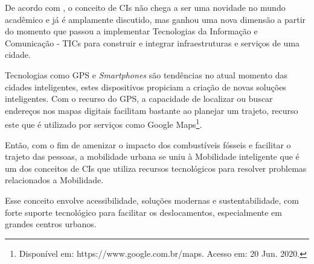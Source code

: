 De acordo com , o conceito de CIs não chega a ser uma novidade no mundo acadêmico e já é amplamente discutido, mas  ganhou uma nova dimensão a partir do momento que passou a implementar Tecnologias da Informação e Comunicação - TICs para construir e integrar infraestruturas e serviços de uma cidade.	

Tecnologias como GPS e \textit{Smartphones} são tendências no atual momento das cidades inteligentes, estes dispositivos propiciam a criação de novas soluções inteligentes. Com o recurso do GPS, a capacidade de localizar ou buscar endereços nos mapas digitais facilitam bastante ao planejar um trajeto, recurso este que é utilizado por serviços como Google Maps\footnote{Disponível em: https://www.google.com.br/maps. Acesso em: 20 Jun. 2020.}.

Então, com o fim de amenizar o impacto dos combustíveis fósseis e facilitar o trajeto das pessoas, a mobilidade urbana se uniu à Mobilidade inteligente que é um dos conceitos de CIs que utiliza recursos tecnológicos para resolver problemas relacionados a Mobilidade.

Esse conceito envolve acessibilidade, soluções modernas e sustentabilidade, com forte suporte tecnológico para facilitar os deslocamentos, especialmente em grandes centros urbanos.



